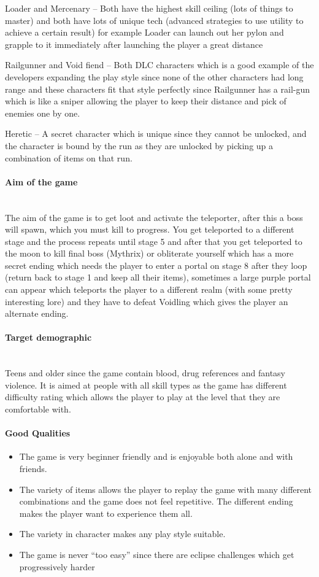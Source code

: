 \documentclass{article}
\newcommand{\parBr}{\vspace{5mm}}%
\newcommand{\myparagraph}[1]{\paragraph{#1}\mbox{}\\} %
\begin{document}
\parBr

Loader and Mercenary – Both have the highest skill ceiling (lots of things to master) and both have lots of unique tech (advanced strategies to use utility to achieve a certain result) for example Loader can launch out her pylon and grapple to it immediately after launching the player a great distance 

\parBr

Railgunner and Void fiend – Both DLC characters which is a good example of the developers expanding the play style since none of the other characters had long range and these characters fit that style perfectly since Railgunner has a rail-gun which is like a sniper allowing the player to keep their distance and pick of enemies one by one. 

\parBr

Heretic – A secret character which is unique since they cannot be unlocked, and the character is bound by the run as they are unlocked by picking up a combination of items on that run. 

\myparagraph{Aim of the game}
The aim of the game is to get loot and activate the teleporter, after this a boss will spawn, which you must kill to progress. You get teleported to a different stage and the process repeats until stage 5 and after that you get teleported to the moon to kill final boss (Mythrix) or obliterate yourself which has a more secret ending which needs the player to enter a portal on stage 8 after they loop (return back to stage 1 and keep all their items), sometimes a large purple portal can appear which teleports the player to a different realm (with some pretty interesting lore) and they have to defeat Voidling which gives the player an alternate ending. 

\myparagraph{Target demographic}
Teens and older since the game contain blood, drug references and fantasy violence. It is aimed at people with all skill types as the game has different difficulty rating which allows the player to play at the level that they are comfortable with.  

\paragraph{Good Qualities}
\begin{itemize}
\item The game is very beginner friendly and is enjoyable both alone and with friends.  
\item The variety of items allows the player to replay the game with many different combinations and the game does not feel repetitive. The different ending makes the player want to experience them all.  
\item The variety in character makes any play style suitable. 
\item The game is never “too easy” since there are eclipse challenges which get progressively harder 
\end{itemize}
\end{document}
